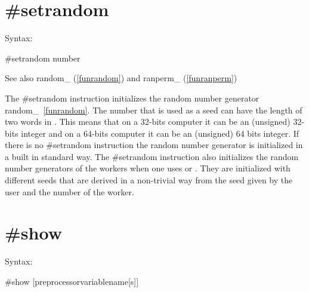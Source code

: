 
\section{\#setrandom}
\label{presetrandom}

\noindent Syntax:

\#setrandom number
 
\noindent See also random\_ (\ref{funrandom}) and ranperm\_ (\ref{funranperm})

\noindent The \#setrandom instruction initializes the 
random number generator 
random\_~\ref{funrandom}. The 
number that is used as a seed can have the length of two words in \FORM\@. 
This means that on a 32-bits computer it can be an (unsigned) 32-bits 
integer and on a 64-bits computer it can be an (unsigned) 64 bits integer. 
If there is no \#setrandom instruction the random number generator is 
initialized in a built in standard way. The \#setrandom instruction also 
initializes the random number generators of the workers when one uses \TFORM{} 
or \ParFORM\@. They are initialized with different seeds that are derived in a 
non-trivial way from the seed given by the user and the number of the 
worker.


\section{\#show}
\label{preshow}

\noindent Syntax:

\#show [preprocessorvariablename[s]]

